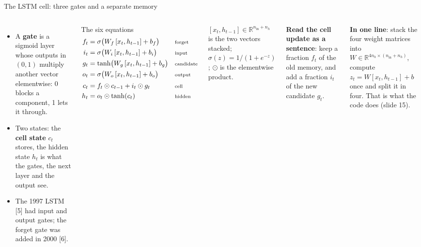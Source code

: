 \documentclass[aspectratio=169,10pt]{beamer}
\newcommand{\R}{\mathbb{R}}
\renewcommand{\cite}[1]{{\scriptsize\color{cTok}[#1]}}
\newcommand{\key}[1]{\textbf{\color{cAtt}#1}}
\newcommand{\sig}{\sigma}
\begin{document}
\begin{frame}{The LSTM cell: three gates and a separate memory}
\begin{columns}[T,onlytextwidth]
\vspace{0.5mm}
\raggedright\footnotesize
\begin{itemize}
  \item A \key{gate} is a sigmoid layer whose outputs in $(0,1)$ multiply another vector
        elementwise: 0 blocks a component, 1 lets it through.
  \item Two states: the \key{cell state} $c_t$ stores, the hidden state $h_t$ is what the gates,
        the next layer and the output see.
  \item The 1997 LSTM \cite{5} had input and output gates; the forget gate was added in 2000 \cite{6}.
\end{itemize}
\small
\begin{block}{The six equations}
\vspace{-3.5mm}
\begin{align*}
 f_t&=\sig\bigl(W_f\,[x_t,h_{t-1}]+b_f\bigr) && \text{\scriptsize forget}\\
 i_t&=\sig\bigl(W_i\,[x_t,h_{t-1}]+b_i\bigr) && \text{\scriptsize input}\\
 g_t&=\tanh\bigl(W_g\,[x_t,h_{t-1}]+b_g\bigr) && \text{\scriptsize candidate}\\
 o_t&=\sig\bigl(W_o\,[x_t,h_{t-1}]+b_o\bigr) && \text{\scriptsize output}\\[2pt]
 c_t&=f_t\odot c_{t-1}+i_t\odot g_t && \text{\scriptsize cell}\\
 h_t&=o_t\odot\tanh(c_t) && \text{\scriptsize hidden}
\end{align*}
\vspace{-5mm}
\end{block}
\footnotesize
$[x_t,h_{t-1}]\in\R^{n_\text{in}+n_h}$ is the two vectors stacked; $\sig(z)=1/(1+e^{-z})$;
$\odot$ is the elementwise product.

\vspace{1mm}
\textbf{Read the cell update as a sentence}: keep a fraction $f_t$ of the old memory, and add a
fraction $i_t$ of the new candidate $g_t$.

\vspace{1mm}
\textbf{In one line}: stack the four weight matrices into $W\in\R^{4n_h\times(n_\text{in}+n_h)}$,
compute $z_t=W[x_t,h_{t-1}]+b$ once and split it in four. That is what the code does (slide 15).
\end{columns}
\end{frame}
\end{document}
